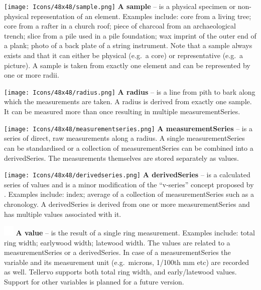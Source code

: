 \begin{description}
\item \texttt{[image: Icons/48x48/sample.png]} \textbf{A sample} -- is a physical specimen or non-physical representation of an element. Examples include: core from a living tree; core from a rafter in a church roof; piece of charcoal from an archaeological trench; slice from a pile used in a pile foundation; wax imprint of the outer end of a plank; photo of a back plate of a string instrument. Note that a sample always exists and that it can either be physical (e.g.\ a core) or representative (e.g.\ a picture). A sample is taken from exactly one element and can be represented by one or more radii.

\item \texttt{[image: Icons/48x48/radius.png]} \textbf{A radius} --  is a line from pith to bark along which the measurements are taken. A radius is derived from exactly one sample. It can be measured more than once resulting in multiple measurementSeries.

\item \texttt{[image: Icons/48x48/measurementseries.png]} \textbf{A measurementSeries} -- is a series of direct, raw measurements along a radius. A single measurementSeries can be standardised or a collection of measurementSeries can be combined into a derivedSeries.  The measurements themselves are stored separately as values.

\item \texttt{[image: Icons/48x48/derivedseries.png]} \textbf{A derivedSeries} -- is a calculated series of values and is a minor modification of the ``v-series'' concept proposed by \cite{corina}.  Examples include: index; average of a collection of measurementSeries such as a chronology. A derivedSeries is derived from one or more measurementSeries and has multiple values associated with it.

\item \includegraphics[width=5mm]{Images/pixel.png} \textbf{A value} --  is the result of a single ring measurement. Examples include: total ring width; earlywood width; latewood width. The values are related to a measurementSeries or a derivedSeries. In case of a measurementSeries the variable and its measurement unit (e.g.\ microns, 1/100th mm etc) are recorded as well.  Tellervo supports both total ring width, and early/latewood values.  Support for other variables is planned for a future version.

\end{description}


